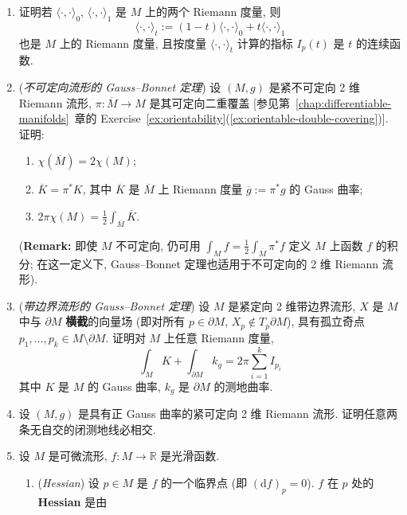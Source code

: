 \begin{RiemannExercise}\label{ex:gauss-bonnet}
\begin{enumerate}[label=(\arabic*),ref=\arabic*,leftmargin=*]
\item\label{ex:index-continuous-under-metric-interpolation} 证明若 $\langle\cdot,\cdot\rangle_0$, $\langle\cdot,\cdot\rangle_1$ 是 $M$ 上的两个 Riemann 度量, 则
\[
  \langle\cdot,\cdot\rangle_t:=(1-t)\langle\cdot,\cdot\rangle_0+t\langle\cdot,\cdot\rangle_1
\]
也是 $M$ 上的 Riemann 度量, 且按度量 $\langle\cdot,\cdot\rangle_t$ 计算的指标 $I_p(t)$ 是 $t$ 的连续函数.
\item\label{ex:gauss-bonnet-for-nonorientable-manifolds} (\emph{不可定向流形的 Gauss–Bonnet 定理}) 设 $(M,g)$ 是紧不可定向 2 维 Riemann 流形, $\pi:\overline M\to M$ 是其可定向二重覆盖 [参见第~\ref{chap:differentiable-manifolds}~章的 Exercise~\ref{ex:orientability}(\ref{ex:orientable-double-covering})]. 证明:
\begin{enumerate}[label=(\alph*),leftmargin=*]
\item $\chi(\overline M)=2\chi(M)$;
\item $\overline K=\pi^*K$, 其中 $\overline K$ 是 $\overline M$ 上 Riemann 度量 $\overline g:=\pi^*g$ 的 Gauss 曲率;
\item $2\pi\chi(M)=\frac12\int_{\overline M}\overline K$.
\end{enumerate}
{\small (\textbf{Remark:} 即使 $M$ 不可定向, 仍可用 $\int_Mf=\frac12\int_{\overline M}\pi^*f$ 定义 $M$ 上函数 $f$ 的积分; 在这一定义下, Gauss–Bonnet 定理也适用于不可定向的 2 维 Riemann 流形).}
\item\label{ex:gauss-bonnet-for-manifolds-with-boundary} (\emph{带边界流形的 Gauss–Bonnet 定理}) 设 $M$ 是紧定向 2 维带边界流形, $X$ 是 $M$ 中与 $\partial M$ \textbf{横截}的向量场 (即对所有 $p\in\partial M$, $X_p\notin T_p\partial M$), 具有孤立奇点 $p_1,\ldots,p_k\in M\setminus\partial M$. 证明对 $M$ 上任意 Riemann 度量,
\[
  \int_M K+\int_{\partial M}k_g=2\pi\sum_{i=1}^k I_{p_i}
\]
其中 $K$ 是 $M$ 的 Gauss 曲率, $k_g$ 是 $\partial M$ 的测地曲率.
\item\label{ex:closed-geodesics-intersect-in-positive-gauss-curvature} 设 $(M,g)$ 是具有正 Gauss 曲率的紧可定向 2 维 Riemann 流形. 证明任意两条无自交的闭测地线必相交.
\item\label{ex:hessian-and-morse-theorem} 设 $M$ 是可微流形, $f:M\to\mathbb{R}$ 是光滑函数.
\begin{enumerate}[label=(\alph*),leftmargin=*]
\item (\emph{Hessian}) 设 $p\in M$ 是 $f$ 的一个临界点 (即 $(\mathrm{d}f)_p=0$). $f$ 在 $p$ 处的 \textbf{Hessian} 是由

\end{enumerate}
\end{enumerate}
\end{RiemannExercise}
